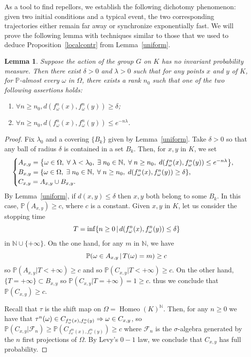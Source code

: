 \documentclass[10pt]{amsart}
\newtheorem{lemm}[theo]{Lemma}\newtheorem{prop}[theo]{Proposition}\newtheorem{coro}[theo]{Corollary}\newtheorem{conj}[theo]{Conjecture}
\theoremstyle{definition}\newtheorem{defi}[theo]{Definition}\newtheorem{rema}[theo]{Remark}\newtheorem{exam}[theo]{Example}\newtheorem{exem}[theo]{Example}\newtheorem{nota}[theo]{Notation}
\DeclareMathOperator{\Homeo}{Homeo}
\newcommand{\bbP}{\mathbb{P}}
\newcommand{\clF}{\mathcal{F}}
\newcommand{\N}{\mathbb{N}}
\newcounter{setofcase}
\newcounter{case}[setofcase]
\renewcommand*{\implies}{\mathchoice{\Longrightarrow}{\Rightarrow}{\Rightarrow}{\Rightarrow}}
\let\originalleft\left
\let\originalright\right
\renewcommand{\left}{\mathopen{}\mathclose\bgroup\originalleft}
\renewcommand{\right}{\aftergroup\egroup\originalright}
\let\oldexists\exists
\renewcommand*{\exists}{\mathrel{\oldexists}}
\let\oldforall\forall
\renewcommand*{\forall}{\mathrel{\oldforall}}
\begin{document}
As a tool to find repellors, we establish the following dichotomy phenomenon: given two initial conditions and a typical event, the two corresponding trajectories either remain far away or synchronize exponentially fast. We will prove the following lemma with techniques similar to those that we used to deduce Proposition~\ref{localcontr} from Lemma~\ref{uniform}.

\begin{lemm}\label{synchro}
Suppose the action of the group $G$ on $K$ has no invariant probability measure. Then there exist $\delta >0$ and $\lambda>0$ such that for any points $x$ and $y$ of $K$, for $\bbP$-almost every $\omega$ in $\Omega$, there exists a rank $n_0$ such that one of the two following assertions holds:
\begin{enumerate}
\item\label{lemm5.4.1} $\forall n\geq n_0, d(f^{n}_{\omega}(x),f^{n}_{\omega}(y)) \geq \delta$;
\item\label{lemm5.4.2} $\forall n\geq n_0, d(f^{n}_{\omega}(x),f^{n}_{\omega}(y))\leq e^{-n\lambda}$.
\end{enumerate}
\end{lemm}
\begin{proof}
Fix $\lambda_0$ and a covering $\{B_k\}$ given by Lemma~\ref{uniform}. Take $\delta>0$ so that any ball of radius $\delta$ is contained in a set $B_k$. Then, for $x,y$ in $K$, we set
\[
\begin{cases}
A_{x,y}=\left\{\omega\in\Omega,\;\forall \lambda<\lambda_0, \;\exists n_0\in \N,\; \forall n\geq n_0,\; d\left(f_\omega^n(x),f_\omega^n(y)\right)\leq e^{-n\lambda}\right\},\\
B_{x,y}=\left\{\omega\in \Omega,\; \exists n_0\in \N,\; \forall n\geq n_0,\; d(f_\omega^n(x),f_\omega^n(y))\geq \delta\right\},\\
C_{x,y}=A_{x,y}\cup B_{x,y}.
\end{cases}
\]
By Lemma~\ref{uniform}, if $d(x,y)\leq \delta$ then $x,y$ both belong to some $B_k$. In this case, $\bbP(A_{x,y})\geq c$, where $c$ is a constant. Given $x,y$ in $K$, let us consider the stopping time
\[
T=\inf\left\{n\geq 0\,\middle|\, d\left(f_\omega^n(x),f_\omega^n(y)\right)\leq \delta \right\}
\]
in $\N\cup\{+\infty\}$. On the one hand, for any $m$ in $\N$, we have
\[
\bbP\left(\omega\in A_{x,y}\,\middle|\,T(\omega)=m\right)\geq c
\]
so $\bbP(A_{x,y}|T<+\infty)\geq c$ and so $\bbP(C_{x,y}|T<+\infty)\geq c$. On the other hand, $\{T=+\infty\}\subset B_{x,y}$ so $\bbP(C_{x,y}|T=+\infty)=1\geq c$. thus we conclude that $\bbP(C_{x,y})\geq c$.

Recall that $\tau$ is the shift map on $\Omega=\Homeo(K)^\N$. Then, for any $n\geq 0$ we have that $\tau^n(\omega)\in C_{f_\omega^n(x),f_\omega^n(y)}\implies \omega\in C_{x,y}$, so $\bbP(C_{x,y}|\clF_n)\geq \bbP(C_{f_\omega^m(x),f_\omega^m(y)})\geq c$ where $\clF_n$ is the $\sigma$-algebra generated by the $n$ first projections of $\Omega$. By Levy's $0-1$ law, we conclude that $C_{x,y}$ has full probability.
\end{proof}
\end{document}
